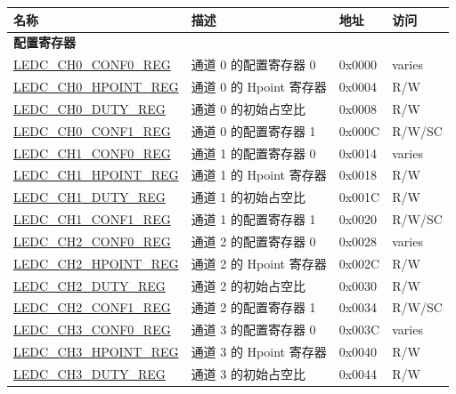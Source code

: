 \begin{longtable}{ | p{5.5cm} | p{6.8cm} | p{1.3cm} | p{2cm} | }
    \hline\rowcolor{lightgray}
    名称 & 描述 &  地址 & 访问 \\ \hline
    \endhead
    \multicolumn{4}{|l|}{\textbf{配置寄存器}} \\ \hline
    \hyperref[regdesc:LEDCCHNCONF0REG]{LEDC\_CH0\_CONF0\_REG} & 通道 0 的配置寄存器 0 & 0x0000 & varies \\ \hline
    \hyperref[regdesc:LEDCCHNHPOINTREG]{LEDC\_CH0\_HPOINT\_REG} & 通道 0 的 Hpoint 寄存器 & 0x0004 & R/W \\ \hline
    \hyperref[regdesc:LEDCCHNDUTYREG]{LEDC\_CH0\_DUTY\_REG} & 通道 0 的初始占空比 & 0x0008 & R/W \\ \hline
    \hyperref[regdesc:LEDCCHNCONF1REG]{LEDC\_CH0\_CONF1\_REG} & 通道 0 的配置寄存器 1 & 0x000C & R/W/SC \\ \hline
    \hyperref[regdesc:LEDCCHNCONF0REG]{LEDC\_CH1\_CONF0\_REG} & 通道 1 的配置寄存器 0 & 0x0014 & varies \\ \hline
    \hyperref[regdesc:LEDCCHNHPOINTREG]{LEDC\_CH1\_HPOINT\_REG} & 通道 1 的 Hpoint 寄存器 & 0x0018 & R/W \\ \hline
    \hyperref[regdesc:LEDCCHNDUTYREG]{LEDC\_CH1\_DUTY\_REG} & 通道 1 的初始占空比 & 0x001C & R/W \\ \hline
    \hyperref[regdesc:LEDCCHNCONF1REG]{LEDC\_CH1\_CONF1\_REG} & 通道 1 的配置寄存器 1 & 0x0020 & R/W/SC \\ \hline
    \hyperref[regdesc:LEDCCHNCONF0REG]{LEDC\_CH2\_CONF0\_REG} & 通道 2 的配置寄存器 0 & 0x0028 & varies \\ \hline
    \hyperref[regdesc:LEDCCHNHPOINTREG]{LEDC\_CH2\_HPOINT\_REG} & 通道 2 的 Hpoint 寄存器 & 0x002C & R/W \\ \hline
    \hyperref[regdesc:LEDCCHNDUTYREG]{LEDC\_CH2\_DUTY\_REG} & 通道 2 的初始占空比 & 0x0030 & R/W \\ \hline
    \hyperref[regdesc:LEDCCHNCONF1REG]{LEDC\_CH2\_CONF1\_REG} & 通道 2 的配置寄存器 1 & 0x0034 & R/W/SC \\ \hline
    \hyperref[regdesc:LEDCCHNCONF0REG]{LEDC\_CH3\_CONF0\_REG} & 通道 3 的配置寄存器 0 & 0x003C & varies \\ \hline
    \hyperref[regdesc:LEDCCHNHPOINTREG]{LEDC\_CH3\_HPOINT\_REG} & 通道 3 的 Hpoint 寄存器 & 0x0040 & R/W \\ \hline
    \hyperref[regdesc:LEDCCHNDUTYREG]{LEDC\_CH3\_DUTY\_REG} & 通道 3 的初始占空比 & 0x0044 & R/W \\ \hline

\end{longtable}
